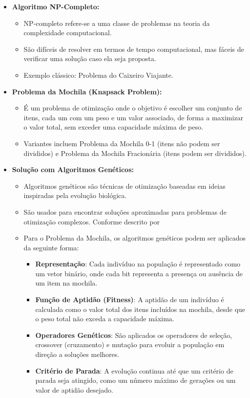 \begin{itemize}
    \item \textbf{Algoritmo NP-Completo:}
        \begin{itemize}
            \item NP-completo refere-se a uma classe de problemas na teoria da complexidade computacional. 
            \item São difíceis de resolver em termos de tempo computacional, mas fáceis de verificar uma solução caso ela seja proposta.
            \item Exemplo clássico: Problema do Caixeiro Viajante.
        \end{itemize}

    \item \textbf{Problema da Mochila (Knapsack Problem):}
        \begin{itemize}
            \item É um problema de otimização onde o objetivo é escolher um conjunto de itens, cada um com um peso e um valor associado, de forma a maximizar o valor total, sem exceder uma capacidade máxima de peso.
            \item Variantes incluem Problema da Mochila 0-1 (itens não podem ser divididos) e Problema da Mochila Fracionária (itens podem ser divididos).
        \end{itemize}

    \item \textbf{Solução com Algoritmos Genéticos:}
        \begin{itemize}
            \item Algoritmos genéticos são técnicas de otimização baseadas em ideias inspiradas pela evolução biológica. 
            \item São usados para encontrar soluções aproximadas para problemas de otimização complexos. Conforme descrito por \cite{cormen}
            \item Para o Problema da Mochila, os algoritmos genéticos podem ser aplicados da seguinte forma:
            \begin{itemize}
                \item \textbf{Representação}: Cada indivíduo na população é representado como um vetor binário, onde cada bit representa a presença ou ausência de um item na mochila.
                \item \textbf{Função de Aptidão (Fitness)}: A aptidão de um indivíduo é calculada como o valor total dos itens incluídos na mochila, desde que o peso total não exceda a capacidade máxima.
                \item \textbf{Operadores Genéticos}: São aplicados os operadores de seleção, crossover (cruzamento) e mutação para evoluir a população em direção a soluções melhores.
                \item \textbf{Critério de Parada}: A evolução continua até que um critério de parada seja atingido, como um número máximo de gerações ou um valor de aptidão desejado.
            \end{itemize}
        \end{itemize}
\end{itemize}

